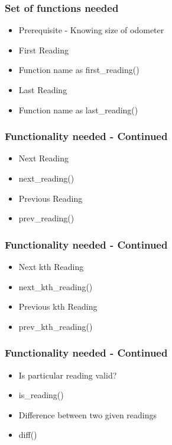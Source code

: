 \documentclass[14pt]{beamer}
\begin{document}
    \begin{frame}[containsverbatim]
        \frametitle{Set of functions needed}
        \begin{itemize}
        \item Prerequisite - Knowing size of odometer
        \item \alert {First Reading} 
        \item Function name as first\_reading()
        \item \alert {Last Reading}
        \item Function name as last\_reading()
        \end{itemize}
    \end{frame}

    \begin{frame}[containsverbatim]
        \frametitle{Functionality needed - Continued}
        \begin{itemize}
        \item \alert {Next Reading}
        \item[] next\_reading()
        \item \alert {Previous Reading}
        \item[] prev\_reading()
        \end{itemize}
    \end{frame}

    \begin{frame}[containsverbatim]
        \frametitle{Functionality needed - Continued}
        \begin{itemize}
        \item \alert {Next kth Reading}
        \item[] next\_kth\_reading()
        \item \alert {Previous kth Reading}
        \item[] prev\_kth\_reading()
        \end{itemize}
    \end{frame}

    \begin{frame}[containsverbatim]
        \frametitle{Functionality needed - Continued}
        \begin{itemize}
        \item \alert {Is particular reading valid?}
        \item[] is\_reading()
        \item \alert {Difference between two given readings} 
        \item[] diff()
        \end{itemize}
    \end{frame}
\end{document}
